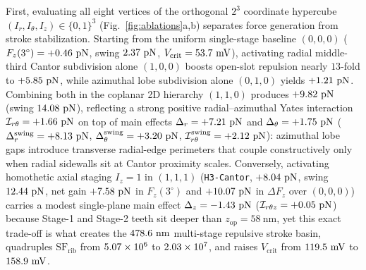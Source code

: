 \documentclass[pdflatex,sn-nature]{sn-jnl}
\begin{document}
First, evaluating all eight vertices of the orthogonal $2^3$ coordinate hypercube $(I_r, I_\theta, I_z) \in \{0,1\}^3$ (Fig.~\ref{fig:ablations}a,b) separates force generation from stroke stabilization. Starting from the uniform single-stage baseline $(0,0,0)$ ($F_z(3^\circ) = \AblFzerozerozeroFzOpen{}\ \mathrm{pN}$, swing $2.37{}\ \mathrm{pN}$, $V_{\mathrm{crit}} = \AblFzerozerozeroVcrit{}\ \mathrm{mV}$), activating radial middle-third Cantor subdivision alone $(1,0,0)$ boosts open-slot repulsion nearly $13$-fold to $\AblFonezerozeroFzOpen{}\ \mathrm{pN}$, while azimuthal lobe subdivision alone $(0,1,0)$ yields $\AblFzeroonezeroFzOpen{}\ \mathrm{pN}$. Combining both in the coplanar 2D hierarchy $(1,1,0)$ produces $\AblFoneonezeroFzOpen{}\ \mathrm{pN}$ (swing $14.08{}\ \mathrm{pN}$), reflecting a strong positive radial--azimuthal Yates interaction $\mathcal{I}_{r\theta} = \AblYatesOpenIrth{}\ \mathrm{pN}$ on top of main effects $\Delta_r = +7.21{}\ \mathrm{pN}$ and $\Delta_\theta = \AblYatesOpenDth{}\ \mathrm{pN}$ ($\Delta_r^{\mathrm{swing}} = \AblYatesSwingDr{}\ \mathrm{pN}$, $\Delta_\theta^{\mathrm{swing}} = +3.20{}\ \mathrm{pN}$, $\mathcal{I}_{r\theta}^{\mathrm{swing}} = +2.12{}\ \mathrm{pN}$): azimuthal lobe gaps introduce transverse radial-edge perimeters that couple constructively only when radial sidewalls sit at Cantor proximity scales. Conversely, activating homothetic axial staging $I_z=1$ in $(1,1,1)$ (\texttt{H3-Cantor}, $+8.04{}\ \mathrm{pN}$, swing $12.44{}\ \mathrm{pN}$, net gain $\AblYatesOpenNet{}\ \mathrm{pN}$ in $F_z(3^\circ)$ and $+10.07{}\ \mathrm{pN}$ in $\Delta F_z$ over $(0,0,0)$) carries a modest single-plane main effect $\Delta_z = -1.43{}\ \mathrm{pN}$ ($\mathcal{I}_{r\theta z} = +0.05{}\ \mathrm{pN}$) because Stage-1 and Stage-2 teeth sit deeper than $z_{\mathrm{op}}=58\ \mathrm{nm}$, yet this exact trade-off is what creates the $478.6{}\ \mathrm{nm}$ multi-stage repulsive stroke basin, quadruples $\mathrm{SF}_{\mathrm{rib}}$ from $5.07\times 10^{6}{}$ to $2.03\times 10^{7}{}$, and raises $V_{\mathrm{crit}}$ from $\AblFoneonezeroVcrit{}\ \mathrm{mV}$ to $\AblFoneoneoneVcrit{}\ \mathrm{mV}$.
\end{document}
